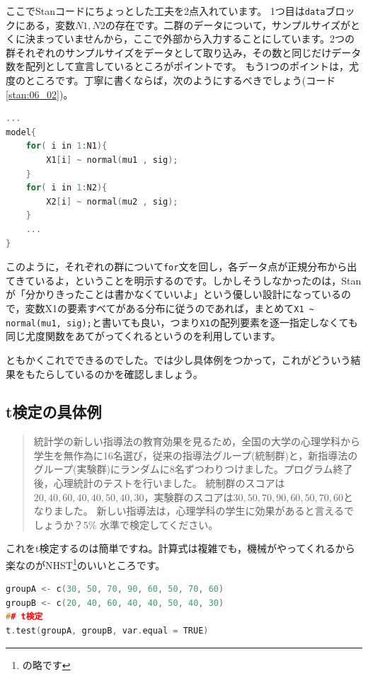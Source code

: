 \documentclass{ltjsbook}
\begin{document}
ここでStanコードにちょっとした工夫を2点入れています。
1つ目は\texttt{data}ブロックにある，変数$N1,N2$の存在です。二群のデータについて，サンプルサイズがとくに決まっていませんから，ここで外部から入力することにしています。2つの群それぞれのサンプルサイズをデータとして取り込み，その数と同じだけデータ数を配列として宣言しているところがポイントです。
もう1つのポイントは，尤度のところです。丁寧に書くならば，次のようにするべきでしょう(コード\ref{stan:06_02})。
\begin{lstlisting}[language=C++,label={stan:06_02},caption={丁寧な尤度の記載}]
    ...
model{
    for( i in 1:N1){
        X1[i] ~ normal(mu1 , sig);
    }
    for( i in 1:N2){
        X2[i] ~ normal(mu2 , sig);
    }
    ...
}

\end{lstlisting}

このように，それぞれの群について\texttt{for}文を回し，各データ点が正規分布から出てきているよ，ということを明示するのです。しかしそうしなかったのは，Stanが「分かりきったことは書かなくていいよ」という優しい設計になっているので，変数X1の要素すべてがある分布に従うのであれば，まとめて\verb|X1 ~ normal(mu1, sig);|と書いても良い，つまり\verb|X1|の配列要素を逐一指定しなくても同じ尤度関数をあてがってくれるというのを利用しています。

ともかくこれでできるのでした。では少し具体例をつかって，これがどういう結果をもたらしているのかを確認しましょう。
\subsection{t検定の具体例}
\begin{quote}
	統計学の新しい指導法の教育効果を見るため，全国の大学の心理学科から学生を無作為に16名選び，従来の指導法グループ(統制群)と，新指導法のグループ(実験群)にランダムに8名ずつわりつけました。プログラム終了後，心理統計のテストを行いました。
	統制群のスコアは$20, 40, 60, 40, 40, 50, 40, 30$，実験群のスコアは$30, 50, 70, 90, 60, 50, 70, 60$となりました。
	新しい指導法は，心理学科の学生に効果があると言えるでしょうか？5\% 水準で検定してください。
\end{quote}

これをt検定するのは簡単ですね。計算式は複雑でも，機械がやってくれるから楽なのがNHST\footnote{の略です}のいいところです。
\begin{lstlisting}[language=c++,label={code:06_03},caption={帰無仮説検定のコード}]
groupA <- c(30, 50, 70, 90, 60, 50, 70, 60)
groupB <- c(20, 40, 60, 40, 40, 50, 40, 30)
## t検定
t.test(groupA, groupB, var.equal = TRUE)
\end{lstlisting}
\end{document}

